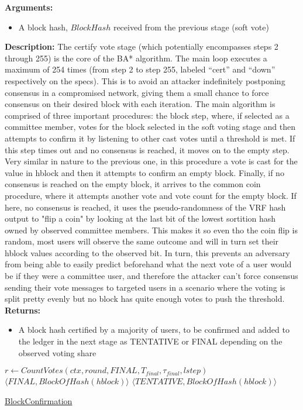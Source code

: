 \documentclass[10pt,a4paper]{article}
\begin{document}
\textbf{Arguments:}
\begin{itemize}
    \item A block hash, $BlockHash$ received from the previous stage (soft vote)
  \end{itemize}

\textbf{Description:}
The certify vote stage (which potentially encompasses steps 2 through 255) is the core of the BA* algorithm.
The main loop executes a maximum of 254 times (from step 2 to step 255, labeled ``cert'' and ``down'' respectively on the specs).
This is to avoid an attacker indefinitely postponing consensus in a compromised network, giving them a small chance to force consensus on their desired block with each iteration.
The main algorithm is comprised of three important procedures: the block step, where, if selected as a committee member, votes for the block selected in the soft voting stage and then attempts to confirm it by listening to other cast votes until a threshold is met.
If this step times out and no consensus is reached, it moves on to the empty step. Very similar in nature to the previous one, in this procedure a vote is cast for the value in hblock and then it attempts to confirm an empty block.
Finally, if no consensus is reached on the empty block, it arrives to the common coin procedure, where it attempts another vote and vote count for the empty block. If here, no consensus is reached, it uses the pseudo-randomness of the VRF hash output to "flip a coin" by looking at the last bit of the lowest sortition hash owned by observed committee members.
This makes it so even tho the coin flip is random, most users will observe the same outcome and will in turn set their hblock values according to the observed bit. In turn, this prevents an adversary from being able to easily predict beforehand what the next vote of a user would be if they were a committee user, and therefore the attacker can't force consensus 
sending their vote messages to targeted users in a scenario where the voting is split pretty evenly but no block has quite enough votes to push the threshold.\\

\textbf{Returns:}
\begin{itemize}
    \item A block hash certified by a majority of users, to be confirmed and added to the ledger in the next stage as TENTATIVE or FINAL depending
    on the observed voting share
  \end{itemize}

\begin{algorithm}
    \begin{algorithmic}[H]

    \State $r \gets CountVotes(ctx, round, FINAL, T_{final}, \tau_{final}, lstep)$
        \State \Return $\langle FINAL, BlockOfHash(hblock)\rangle$ 
    \Else
    {
        \State \Return $\langle TENTATIVE, BlockOfHash(hblock)\rangle $
    }
    \EndIf
    \EndFunction
    \end{algorithmic}
    \caption{\underline{BlockConfirmation}}
\end{algorithm}
\end{document}
